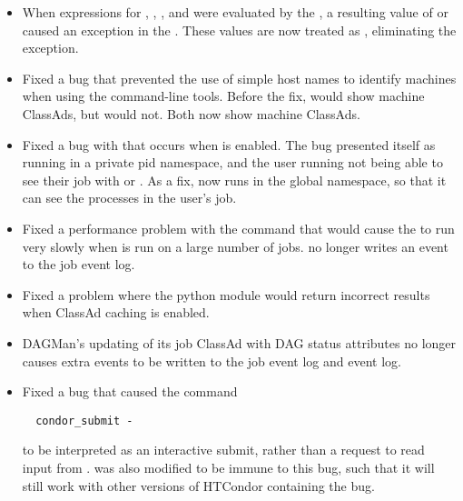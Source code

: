 \begin{itemize}

\item When expressions for ,
, , and 
were evaluated by the ,
a resulting value of
 or  caused an exception in the .
These values are now treated as ,
eliminating the exception.

\item Fixed a bug that prevented the use of simple host names to identify
machines when using the command-line tools. Before the fix,
 would show machine ClassAds, but
 would not.
Both now show machine ClassAds.

\item Fixed a bug with  that occurs when
 is enabled.
The bug presented itself as 
running in a private pid namespace, 
and the user running  not being able to see 
their job with  or .
As a fix,  now runs in the global namespace, 
so that it can see the processes in the user's job.

\item Fixed a performance problem with the  command 
that would cause the  to run very slowly when 
 is run on a large number of jobs.  
 no longer writes an event to the job event log. 

\item Fixed a problem where the  python module would return
incorrect results when ClassAd caching is enabled.

\item DAGMan's updating of its job ClassAd with DAG status attributes no
longer causes extra events to be written to the job event log and event log.

\item Fixed a bug that caused the command
\begin{verbatim}
  condor_submit -
\end{verbatim}
to be interpreted as an interactive submit,
rather than a request to read input from .
 was also modified to be immune to this bug,
such that it will still work with other versions of HTCondor containing
the bug.


\end{itemize}
